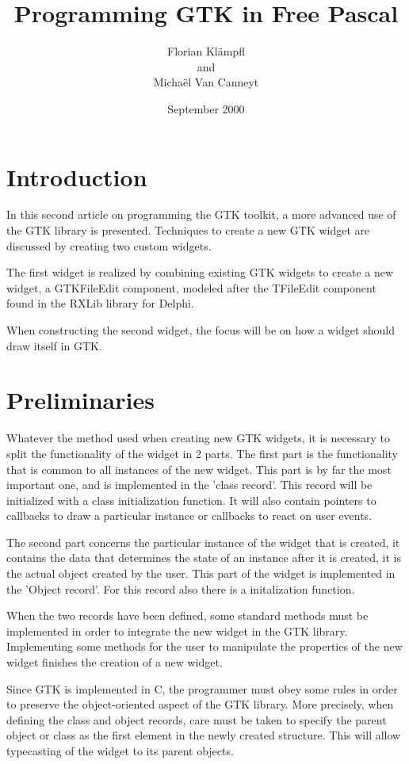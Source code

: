 \documentclass[10pt]{article}
\begin{document}
\title{Programming GTK in Free Pascal}
\author{Florian Kl\"ampfl\\and\\Micha\"el Van Canneyt}
\date{September 2000}
\maketitle
\section{Introduction}
In this second article on programming the GTK toolkit, a more advanced use
of the GTK library is presented. Techniques to create a new GTK widget
are discussed by creating two custom widgets. 

The first widget is realized by combining existing GTK widgets to create 
a new widget, a GTKFileEdit component, modeled after the TFileEdit component
found in the RXLib library for Delphi.

When constructing the second widget, the focus will be on how a widget
should draw itself in GTK.

\section{Preliminaries}
Whatever the method used when creating new GTK widgets, it is necessary to 
split the functionality of the widget in 2 parts. 
The first part is the functionality that is common to all instances of the 
new widget. This part is by far the most important one, and is implemented 
in the 'class record'. This record will be initialized with a class 
initialization function. It will also contain pointers to callbacks to
draw a particular instance or callbacks to react on user events.

The second part concerns the particular instance of the widget that is 
created, it contains the data that determines the state of an instance
after it is created, it is the actual object created by the user. This 
part of the widget is implemented in the 'Object record'. For this record
also there is a initalization function.

When the two records have been defined, some standard methods must be 
implemented in order to integrate the new widget in the GTK library. 
Implementing some methods for the user to manipulate the properties 
of the new widget finishes the creation of a new widget.

Since GTK is implemented in C, the programmer must obey some rules in order
to preserve the object-oriented aspect of the GTK library. More precisely,
when defining the class and object records, care must be taken to specify 
the parent object or class as the first element in the newly created structure. This
will allow typecasting of the widget to its parent objects.
\end{document}
